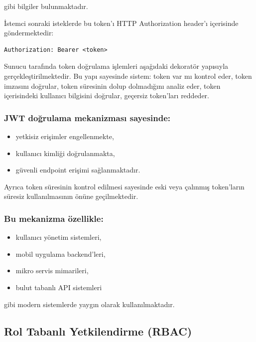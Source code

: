 gibi bilgiler bulunmaktadır.

İstemci sonraki isteklerde bu token’ı HTTP Authorization header’ı içerisinde göndermektedir:

\begin{lstlisting}
Authorization: Bearer <token>
\end{lstlisting}

Sunucu tarafında token doğrulama işlemleri aşağıdaki dekoratör yapısıyla gerçekleştirilmektedir. Bu yapı sayesinde sistem: token var mı kontrol eder, token imzasını doğrular, token süresinin dolup dolmadığını analiz eder, token içerisindeki kullanıcı bilgisini doğrular, geçersiz token’ları reddeder.

\subsubsection{JWT doğrulama mekanizması sayesinde:}

\begin{itemize}[leftmargin=*]
    \item yetkisiz erişimler engellenmekte,
    \item kullanıcı kimliği doğrulanmakta,
    \item güvenli endpoint erişimi sağlanmaktadır.
\end{itemize}

Ayrıca token süresinin kontrol edilmesi sayesinde eski veya çalınmış token’ların süresiz kullanılmasının önüne geçilmektedir.

\subsubsection{Bu mekanizma özellikle:}

\begin{itemize}[leftmargin=*]
    \item kullanıcı yönetim sistemleri,
    \item mobil uygulama backend’leri,
    \item mikro servis mimarileri,
    \item bulut tabanlı API sistemleri
\end{itemize}

gibi modern sistemlerde yaygın olarak kullanılmaktadır.

\subsection{Rol Tabanlı Yetkilendirme (RBAC)}
\label{rol-tabanl-yetkilendirme-rbac}

